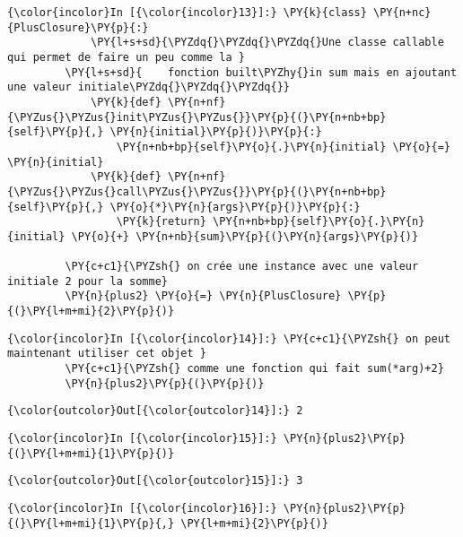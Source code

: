     \begin{Verbatim}[commandchars=\\\{\}]
{\color{incolor}In [{\color{incolor}13}]:} \PY{k}{class} \PY{n+nc}{PlusClosure}\PY{p}{:}
             \PY{l+s+sd}{\PYZdq{}\PYZdq{}\PYZdq{}Une classe callable qui permet de faire un peu comme la }
         \PY{l+s+sd}{    fonction built\PYZhy{}in sum mais en ajoutant une valeur initiale\PYZdq{}\PYZdq{}\PYZdq{}}
             \PY{k}{def} \PY{n+nf}{\PYZus{}\PYZus{}init\PYZus{}\PYZus{}}\PY{p}{(}\PY{n+nb+bp}{self}\PY{p}{,} \PY{n}{initial}\PY{p}{)}\PY{p}{:}
                 \PY{n+nb+bp}{self}\PY{o}{.}\PY{n}{initial} \PY{o}{=} \PY{n}{initial}
             \PY{k}{def} \PY{n+nf}{\PYZus{}\PYZus{}call\PYZus{}\PYZus{}}\PY{p}{(}\PY{n+nb+bp}{self}\PY{p}{,} \PY{o}{*}\PY{n}{args}\PY{p}{)}\PY{p}{:}
                 \PY{k}{return} \PY{n+nb+bp}{self}\PY{o}{.}\PY{n}{initial} \PY{o}{+} \PY{n+nb}{sum}\PY{p}{(}\PY{n}{args}\PY{p}{)}
             
         \PY{c+c1}{\PYZsh{} on crée une instance avec une valeur initiale 2 pour la somme}
         \PY{n}{plus2} \PY{o}{=} \PY{n}{PlusClosure} \PY{p}{(}\PY{l+m+mi}{2}\PY{p}{)}
\end{Verbatim}


    \begin{Verbatim}[commandchars=\\\{\}]
{\color{incolor}In [{\color{incolor}14}]:} \PY{c+c1}{\PYZsh{} on peut maintenant utiliser cet objet }
         \PY{c+c1}{\PYZsh{} comme une fonction qui fait sum(*arg)+2}
         \PY{n}{plus2}\PY{p}{(}\PY{p}{)}
\end{Verbatim}


\begin{Verbatim}[commandchars=\\\{\}]
{\color{outcolor}Out[{\color{outcolor}14}]:} 2
\end{Verbatim}
            
    \begin{Verbatim}[commandchars=\\\{\}]
{\color{incolor}In [{\color{incolor}15}]:} \PY{n}{plus2}\PY{p}{(}\PY{l+m+mi}{1}\PY{p}{)}
\end{Verbatim}


\begin{Verbatim}[commandchars=\\\{\}]
{\color{outcolor}Out[{\color{outcolor}15}]:} 3
\end{Verbatim}
            
    \begin{Verbatim}[commandchars=\\\{\}]
{\color{incolor}In [{\color{incolor}16}]:} \PY{n}{plus2}\PY{p}{(}\PY{l+m+mi}{1}\PY{p}{,} \PY{l+m+mi}{2}\PY{p}{)}
\end{Verbatim}



